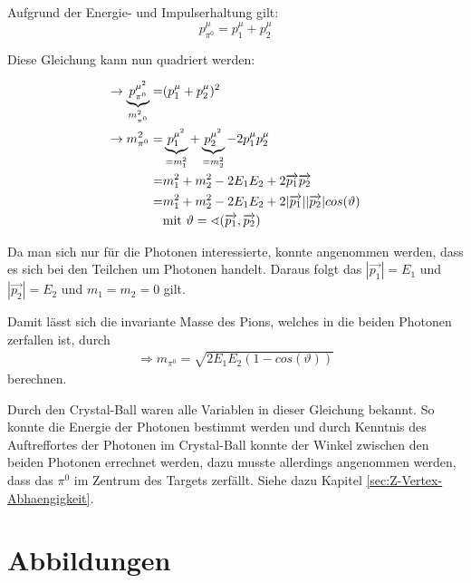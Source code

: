 \documentclass[a4paper,11pt,oneside,final,german,openbib,pdftex]{scrbook}
\begin{document}
{\begin{appendix}
Aufgrund der Energie- und Impulserhaltung gilt:
\begin{equation}
p^{\mu}_{\pi^0} = p^{\mu}_1 + p^{\mu}_2
\end{equation}

Diese Gleichung kann nun quadriert werden:

\begin{equation}
\begin{split}
\rightarrow \underbrace{p^{\mu^2}_{\pi^0}}_{m_{\pi^0}^2}=& (p_{1}^{\mu}+p_{2}^{\mu})^2 \\ 
\rightarrow m_{\pi^0}^2=& \underbrace{p_{1}^{\mu^2}}_{=m_1^2}+\underbrace{p_{2}^{\mu^2}}_{=m_2^2}-2p_{1}^{\mu}p_{2}^{\mu} \\ 
=& m_1^2+m_2^2-2E_1E_2+2\overrightarrow{p_1}\overrightarrow{p_2} \\ 
=& m_1^2+m_2^2-2E_1E_2+2|\overrightarrow{p_1}| |\overrightarrow{p_2}| cos(\vartheta) \\
&\textnormal{mit } \vartheta=\sphericalangle(\overrightarrow{p_1},\overrightarrow{p_2})
\end{split}
\end{equation}

Da man sich nur f\"ur die Photonen interessierte, konnte angenommen werden, dass es sich bei den Teilchen um Photonen handelt. Daraus folgt das $|\overrightarrow{p_1}|=E_1$ und $|\overrightarrow{p_2}|=E_2$ und $m_1=m_2=0$ gilt.

Damit lässt sich die invariante Masse des Pions, welches in die beiden Photonen zerfallen ist, durch
\begin{equation}
\begin{split}
\Rightarrow{m_{\pi^0}=\sqrt{2E_1E_2(1-cos(\vartheta))}}
\label{eq:Formel-zur-Berechnung-der-Invariante-Masse-Herleitung}
\end{split}
\end{equation}
berechnen.

Durch den Crystal-Ball waren alle Variablen in dieser Gleichung bekannt. So konnte die Energie der Photonen bestimmt werden und durch Kenntnis des Auftreffortes der Photonen im Crystal-Ball konnte der Winkel zwischen den beiden Photonen errechnet werden, dazu musste allerdings angenommen werden, dass das $\pi^0$ im Zentrum des Targets zerfällt. Siehe dazu Kapitel \ref{sec:Z-Vertex-Abhaengigkeit}.

\section{Abbildungen}


\end{appendix}}
\end{document}
